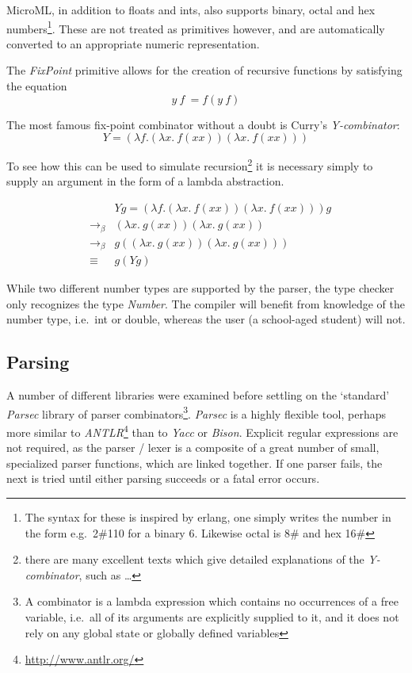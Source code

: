 \documentclass[12pt, a4paper]{report}
\begin{document}
MicroML, in addition to floats and ints, also supports binary, octal and hex numbers\footnote{The
    syntax for these is inspired by erlang, one simply writes the number in the form e.g.\ 2\#110 for a
    binary 6. Likewise octal is 8\# and hex 16\#}. These are not
treated as primitives however, and are automatically converted to an appropriate numeric representation.

The \textit{FixPoint} primitive allows for the creation of recursive functions by satisfying the equation
\begin{displaymath}
    y\ f\ = f (y\ f)
\end{displaymath}

The most famous fix-point combinator without a doubt is Curry's \textit{Y-combinator}:
\begin{displaymath}
    Y = (\lambda f. (\lambda x.\ f (x x)) (\lambda x.\ f (x x)))
\end{displaymath}

To see how this can be used to simulate recursion\footnote{there are many excellent texts which
    give detailed explanations of the \textit{Y-combinator}, such as \dots } it is necessary simply
to supply an argument in the form of a lambda abstraction.

\begin{figure}
    \centering
    \begin{eqnarray*}
        && Y g = (\lambda f. (\lambda x.\ f (x x)) (\lambda x.\ f (x x))) g \\
        & \to_\beta & (\lambda x.\ g (x x)) (\lambda x.\ g (x x)) \\
        & \to_\beta & g ((\lambda x.\ g (x x)) (\lambda x.\ g (x x))) \\
        & \equiv & g (Y g)
    \end{eqnarray*}
\end{figure}

While two different number types are supported by the parser, the type checker only recognizes the
type \textit{Number}. The compiler will benefit from knowledge of the number type, i.e.\ int or double,
whereas the user (a school-aged student) will not.

\subsection{Parsing}
A number of different libraries were examined before settling on the `standard'
\textit{Parsec} library of parser combinators\footnote{A combinator is a lambda expression which
    contains no occurrences of a free variable, i.e.\ all of its arguments are
    explicitly supplied to it, and it does not rely on any global state or globally defined
    variables}. \textit{Parsec} is a highly
flexible tool, perhaps more similar to \textit{ANTLR}\footnote{\url{http://www.antlr.org/}} than to
\textit{Yacc} or \textit{Bison}. Explicit regular expressions are not required, as the parser /
lexer is a composite of a great number of small, specialized parser functions, which are linked
together. If one parser fails, the next is tried until either parsing succeeds or a fatal error
occurs. 
\end{document}
